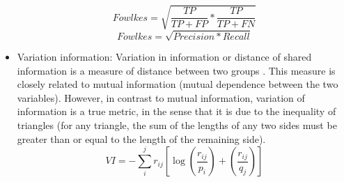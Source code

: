 \begin{itemize}
    \begin{equation}
        Fowlkes = \sqrt{\frac{TP}{TP + FP}*\frac{TP}{TP + FN}}
    \end{equation}
    \begin{equation}
        Fowlkes = \sqrt{Precision*Recall}
    \end{equation}


    \item Variation information: Variation in information or distance of shared information is a measure of distance between two groups \citep{b43}. This measure is closely related to mutual information (mutual dependence between the two variables). However, in contrast to mutual information, variation of information is a true metric, in the sense that it is due to the inequality of triangles (for any triangle, the sum of the lengths of any two sides must be greater than or equal to the length of the remaining side).
    \begin{equation}
       VI = - \sum_{i}^{j} r_{ij}\left[\log\left(\frac{r_{ij}}{p_{i}}\right) +\left(\frac{r_{ij}}{q_{j}} \right)\right]
    \end{equation}
\end{itemize}


